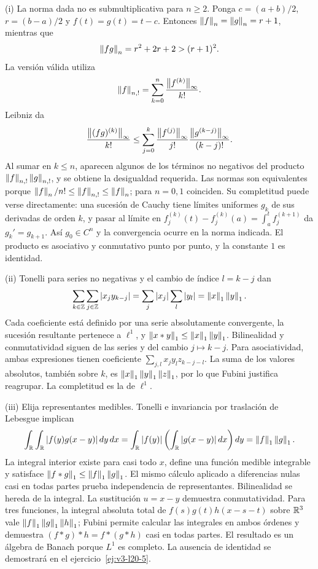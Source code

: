 \begin{solucion}
(i) La norma dada no es submultiplicativa para $n\geq2$. Ponga $c=(a+b)/2$, $r=(b-a)/2$ y $f(t)=g(t)=t-c$. Entonces $\left\lVert f\right\rVert_n=\left\lVert g\right\rVert_n=r+1$, mientras que
\[
 \left\lVert fg\right\rVert_n=r^2+2r+2>(r+1)^2.
\]
La versión válida utiliza
\[
 \left\lVert f\right\rVert_{n,!}=\sum_{k=0}^n\frac{\left\lVert f^{(k)}\right\rVert_\infty}{k!}.
\]
Leibniz da
\[
 \frac{\left\lVert(fg)^{(k)}\right\rVert_\infty}{k!}
 \leq\sum_{j=0}^k\frac{\left\lVert f^{(j)}\right\rVert_\infty}{j!}
                       \frac{\left\lVert g^{(k-j)}\right\rVert_\infty}{(k-j)!}.
\]
Al sumar en $k\leq n$, aparecen algunos de los términos no negativos del producto $\left\lVert f\right\rVert_{n,!}\left\lVert g\right\rVert_{n,!}$, y se obtiene la desigualdad requerida. Las normas son equivalentes porque $\left\lVert f\right\rVert_n/n!\leq\left\lVert f\right\rVert_{n,!}\leq\left\lVert f\right\rVert_n$; para $n=0,1$ coinciden. Su completitud puede verse directamente: una sucesión de Cauchy tiene límites uniformes $g_k$ de sus derivadas de orden $k$, y pasar al límite en $f_j^{(k)}(t)-f_j^{(k)}(a)=\int_a^t f_j^{(k+1)}$ da $g_k'=g_{k+1}$. Así $g_0\in C^n$ y la convergencia ocurre en la norma indicada. El producto es asociativo y conmutativo punto por punto, y la constante $1$ es identidad.

(ii) Tonelli para series no negativas y el cambio de índice $l=k-j$ dan
\[
 \sum_{k\in\mathbb Z}\sum_{j\in\mathbb Z}|x_jy_{k-j}|
 =\sum_j|x_j|\sum_l|y_l|=\left\lVert x\right\rVert_1\left\lVert y\right\rVert_1.
\]
Cada coeficiente está definido por una serie absolutamente convergente, la sucesión resultante pertenece a $\ell^1$, y $\left\lVert x*y\right\rVert_1\leq\left\lVert x\right\rVert_1\left\lVert y\right\rVert_1$. Bilinealidad y conmutatividad siguen de las series y del cambio $j\mapsto k-j$. Para asociatividad, ambas expresiones tienen coeficiente $\sum_{j,l}x_jy_lz_{k-j-l}$. La suma de los valores absolutos, también sobre $k$, es $\left\lVert x\right\rVert_1\left\lVert y\right\rVert_1\left\lVert z\right\rVert_1$, por lo que Fubini justifica reagrupar. La completitud es la de $\ell^1$.

(iii) Elija representantes medibles. Tonelli e invariancia por traslación de Lebesgue implican
\[
 \int_\mathbb R\int_\mathbb R |f(y)g(x-y)|\,dy\,dx
 =\int_\mathbb R |f(y)|\left(\int_\mathbb R|g(x-y)|\,dx\right)dy
 =\left\lVert f\right\rVert_1\left\lVert g\right\rVert_1.
\]
La integral interior existe para casi todo $x$, define una función medible integrable y satisface $\left\lVert f*g\right\rVert_1\leq\left\lVert f\right\rVert_1\left\lVert g\right\rVert_1$. El mismo cálculo aplicado a diferencias nulas casi en todas partes prueba independencia de representantes. Bilinealidad se hereda de la integral. La sustitución $u=x-y$ demuestra conmutatividad. Para tres funciones, la integral absoluta total de $f(s)g(t)h(x-s-t)$ sobre $\mathbb R^3$ vale $\left\lVert f\right\rVert_1\left\lVert g\right\rVert_1\left\lVert h\right\rVert_1$; Fubini permite calcular las integrales en ambos órdenes y demuestra $(f*g)*h=f*(g*h)$ casi en todas partes. El resultado es un álgebra de Banach porque $L^1$ es completo. La ausencia de identidad se demostrará en el ejercicio~\ref{ej:v3-l20-5}.
\end{solucion}

